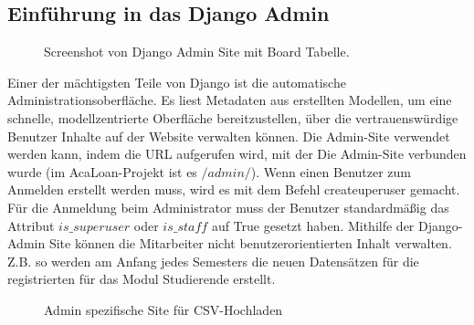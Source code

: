 \subsection{Einführung in das Django Admin}
\label{sec:server:admin}
\begin{figure}
	\centering
	\caption{Screenshot von Django Admin Site mit Board Tabelle.}
	\label{fig:django_admin}
\end{figure}
Einer der mächtigsten Teile von Django ist die automatische Administrationsoberfläche. Es liest Metadaten aus erstellten Modellen, um eine schnelle, modellzentrierte Oberfläche bereitzustellen, über die vertrauenswürdige Benutzer Inhalte auf der Website verwalten können\cite{website:djangoAdmin}. Die Admin-Site verwendet werden kann, indem die URL aufgerufen wird, mit der Die Admin-Site verbunden wurde (im AcaLoan-Projekt ist es $/admin/$). Wenn einen Benutzer zum Anmelden erstellt werden muss, wird es mit dem Befehl createuperuser gemacht. Für die Anmeldung beim Administrator muss der Benutzer standardmäßig das Attribut $is\_superuser$ oder $is\_staff$ auf True gesetzt haben. Mithilfe der Django-Admin Site können die Mitarbeiter nicht benutzerorientierten Inhalt verwalten. Z.B. so werden am Anfang jedes Semesters die neuen Datensätzen für die registrierten für das Modul Studierende erstellt. 
\begin{figure}
	\caption{Admin spezifische Site für CSV-Hochladen}
	\label{fig:upload_csv}
\end{figure}
